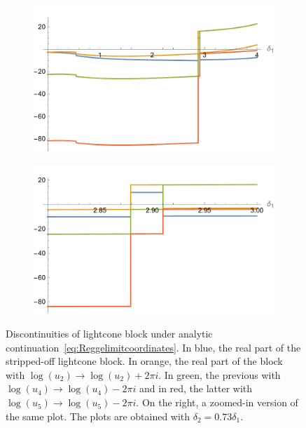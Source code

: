 \begin{figure}
  \centering
  \begin{subfigure}{.5\textwidth}
    \centering
    \includegraphics[scale=.55]{Chapters/discs.pdf}
  \end{subfigure}%
  \begin{subfigure}{.5\textwidth}
    \centering
    \includegraphics[scale=.55]{Chapters/discszoom.pdf}
  \end{subfigure}
  \caption{Discontinuities of lightcone block under analytic continuation~\eqref{eq:Reggelimitcoordinates}. In blue, the real part of the stripped-off lightcone block. In orange, the real part of the block with $\log(u_2)\to \log(u_2)+2\pi i$. In green, the previous with $\log(u_4)\to \log(u_4)-2\pi i$ and in red, the latter with $\log(u_5)\to \log(u_5)-2\pi i$. On the right, a zoomed-in version of the same plot. The plots are obtained with $\delta_2=0.73 \delta_1$. }
  \label{fig:discsforsimplecase}
\end{figure}
